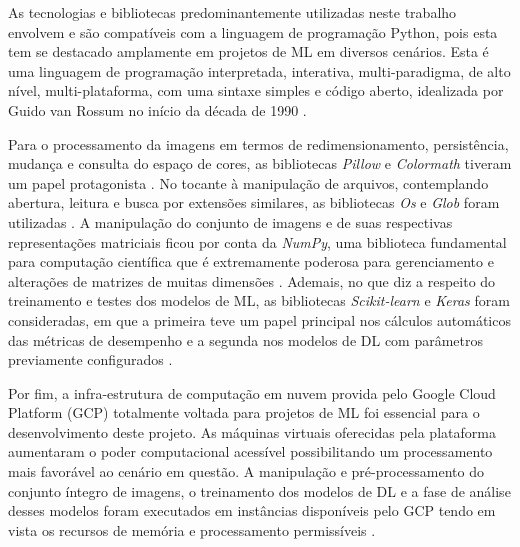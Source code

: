 As tecnologias e bibliotecas predominantemente utilizadas neste trabalho envolvem e são compatíveis com a linguagem de programação Python, pois esta tem se destacado amplamente em projetos de ML em diversos cenários. Esta é uma linguagem de programação interpretada, interativa, multi-paradigma,  de alto nível, multi-plataforma, com uma sintaxe simples e código aberto, idealizada por Guido van Rossum no início da década de 1990 \cite{ref:python}.

Para o processamento da imagens em termos de redimensionamento, persistência, mudança e consulta do espaço de cores, as bibliotecas \emph{Pillow} e \emph{Colormath} tiveram um papel protagonista \cite{lib:pillow,lib:colormath}. No tocante à manipulação de arquivos, contemplando abertura, leitura e busca por extensões similares, as bibliotecas \emph{Os} e \emph{Glob} foram utilizadas \cite{lib:os,lib:glob}. A manipulação do conjunto de imagens e de suas respectivas representações matriciais ficou por conta da \emph{NumPy}, uma biblioteca fundamental para computação científica que é extremamente poderosa para gerenciamento e alterações de matrizes de muitas dimensões \cite{lib:numpy}.  Ademais, no que diz a respeito do treinamento e testes dos modelos de ML, as bibliotecas \emph{Scikit-learn} e \emph{Keras} foram consideradas, em que a primeira teve um papel principal nos cálculos automáticos das métricas de desempenho e a segunda nos modelos de DL com parâmetros previamente configurados \cite{lib:scikit,lib:keras}.

Por fim, a infra-estrutura de computação em nuvem provida pelo Google Cloud Platform (GCP) totalmente voltada para projetos de ML foi essencial para o desenvolvimento deste projeto. As máquinas virtuais oferecidas pela plataforma aumentaram o poder computacional acessível possibilitando um processamento mais favorável ao cenário em questão. A manipulação e pré-processamento do conjunto íntegro de imagens, o treinamento dos modelos de DL e a fase de análise desses modelos foram executados em instâncias disponíveis pelo GCP tendo em vista os recursos de memória e processamento permissíveis \cite{tec:gcloud}.